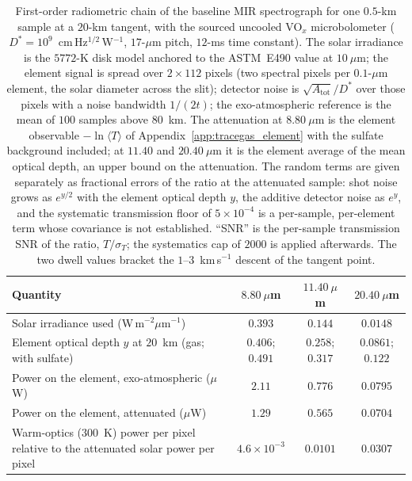 \begin{table}[t]
\caption{First-order radiometric chain of the baseline MIR spectrograph for one $0.5$-km sample at a $20$-km tangent, with the sourced uncooled VO$_x$ microbolometer ($D^{*}=10^{9}$~cm\,Hz$^{1/2}$\,W$^{-1}$, $17$-$\mu$m pitch, $12$-ms time constant). The solar irradiance is the $5772$-K disk model anchored to the ASTM~E490 value at $10~\mu$m; the element signal is spread over $2\times112$ pixels (two spectral pixels per $0.1$-$\mu$m element, the solar diameter across the slit); detector noise is $\sqrt{A_\text{tot}}/D^{*}$ over those pixels with a noise bandwidth $1/(2t)$; the exo-atmospheric reference is the mean of $100$ samples above $80$~km. The attenuation at $8.80~\mu$m is the element observable $-\ln\langle T\rangle$ of Appendix~\ref{app:tracegas_element} with the sulfate background included; at $11.40$ and $20.40~\mu$m it is the element average of the mean optical depth, an upper bound on the attenuation. The random terms are given separately as fractional errors of the ratio at the attenuated sample: shot noise grows as $e^{y/2}$ with the element optical depth $y$, the additive detector noise as $e^{y}$, and the systematic transmission floor of $5\times10^{-4}$ is a per-sample, per-element term whose covariance is not established. ``SNR'' is the per-sample transmission SNR of the ratio, $T/\sigma_T$; the systematics cap of $2000$ is applied afterwards. The two dwell values bracket the $1$--$3$~km\,s$^{-1}$ descent of the tangent point.}
\label{tab:radiometric_budget}
\centering\footnotesize
\begin{tabular}{lccc}
\toprule
Quantity & $8.80~\mu$m & $11.40~\mu$m & $20.40~\mu$m \\
\midrule
Solar irradiance used (W\,m$^{-2}\mu$m$^{-1}$) & $0.393$ & $0.144$ & $0.0148$ \\
Element optical depth $y$ at $20$~km (gas; with sulfate) & $0.406$; $0.491$ & $0.258$; $0.317$ & $0.0861$; $0.122$ \\
Power on the element, exo-atmospheric ($\mu$W) & $2.11$ & $0.776$ & $0.0795$ \\
Power on the element, attenuated ($\mu$W) & $1.29$ & $0.565$ & $0.0704$ \\
Warm-optics ($300$~K) power per pixel relative to the attenuated solar power per pixel & $4.6\times10^{-3}$ & $0.0101$ & $0.0307$ \\

\end{tabular}
\end{table}
